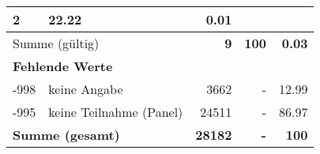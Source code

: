 \begin{longtable}{lXrrr}
       \num{2} &
       \num[round-mode=places,round-precision=2]{22.22} &
         \num[round-mode=places,round-precision=2]{0.01} \\
     \midrule
     \multicolumn{2}{l}{Summe (gültig)} &
       \textbf{\num{9}} &
     \textbf{\num{100}} &
       \textbf{\num[round-mode=places,round-precision=2]{0.03}} \\
     \multicolumn{5}{l}{\textbf{Fehlende Werte}}\\
       -998 &
       keine Angabe &
         \num{3662} &
        - &
         \num[round-mode=places,round-precision=2]{12.99} \\
       -995 &
       keine Teilnahme (Panel) &
         \num{24511} &
        - &
         \num[round-mode=places,round-precision=2]{86.97} \\
     \midrule
     \multicolumn{2}{l}{\textbf{Summe (gesamt)}} &
          \textbf{\num{28182}} &
        \textbf{-} &
        \textbf{\num{100}} \\
     \bottomrule
     \end{longtable}
     
